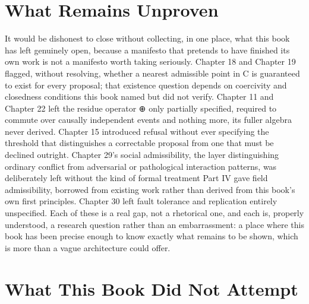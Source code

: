 \section{What Remains Unproven}

It would be dishonest to close without collecting, in one place, what this book has left genuinely open, because a manifesto that pretends to have finished its own work is not a manifesto worth taking seriously. Chapter 18 and Chapter 19 flagged, without resolving, whether a nearest admissible point in C is guaranteed to exist for every proposal; that existence question depends on coercivity and closedness conditions this book named but did not verify. Chapter 11 and Chapter 22 left the residue operator ⊕ only partially specified, required to commute over causally independent events and nothing more, its fuller algebra never derived. Chapter 15 introduced refusal without ever specifying the threshold that distinguishes a correctable proposal from one that must be declined outright. Chapter 29's social admissibility, the layer distinguishing ordinary conflict from adversarial or pathological interaction patterns, was deliberately left without the kind of formal treatment Part IV gave field admissibility, borrowed from existing work rather than derived from this book's own first principles. Chapter 30 left fault tolerance and replication entirely unspecified. Each of these is a real gap, not a rhetorical one, and each is, properly understood, a research question rather than an embarrassment: a place where this book has been precise enough to know exactly what remains to be shown, which is more than a vague architecture could offer.

\section{What This Book Did Not Attempt}

